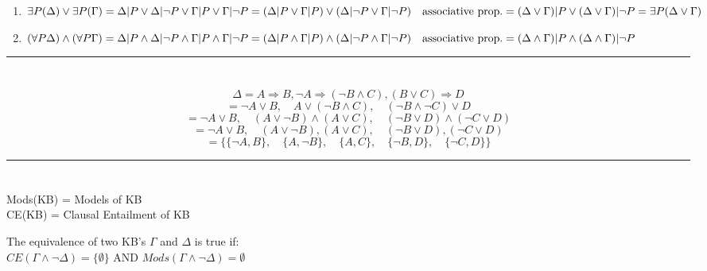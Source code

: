 \documentclass{article}
\begin{document}
\section{}
\renewcommand{\labelenumi}{(\alph{enumi})}
 \begin{enumerate}
   \item $\exists P (\Delta) \lor \exists P (\Gamma) \\
   = \Delta | P \lor \Delta | \lnot P \lor \Gamma | P \lor \Gamma | \lnot P \\
   = (\Delta | P \lor \Gamma | P) \lor (\Delta | \lnot P \lor \Gamma | \lnot P) \quad \textrm{associative prop.}\\
   = (\Delta \lor \Gamma) | P \lor (\Delta \lor \Gamma) | \lnot P \\
   = \exists P (\Delta \lor \Gamma) $
   \item $ (\forall P \Delta) \land (\forall P \Gamma) \\
   = \Delta | P \land \Delta | \lnot P \land \Gamma | P \land \Gamma | \lnot P \\
   = (\Delta | P \land \Gamma | P) \land (\Delta | \lnot P \land \Gamma | \lnot P) \quad \textrm{associative prop.}\\
   = (\Delta \land \Gamma) | P \land (\Delta \land \Gamma) | \lnot P$
 \end{enumerate}

 \noindent\rule{16cm}{0.4pt}
 \section{}
 \[\Delta = A \Rightarrow B, \lnot A \Rightarrow (\lnot B \land C), (B \lor C) \Rightarrow D\]
 \[= \lnot A \lor B, \quad A \lor (\lnot B \land C), \quad (\lnot B \land \lnot C) \lor D\]
 \[= \lnot A \lor B, \quad (A \lor \lnot B) \land (A \lor C), \quad (\lnot B \lor D) \land (\lnot C \lor D)\]
 \[= \lnot A \lor B, \quad (A \lor \lnot B), (A \lor C), \quad (\lnot B \lor D), (\lnot C \lor D)\]
 \[= \{\{\lnot A, B\}, \quad \{A, \lnot B\}, \quad \{A, C\}, \quad \{\lnot B, D\}, \quad \{\lnot C, D\}\}\]
 
 \noindent\rule{16cm}{0.4pt}
 \section{}
 Mods(KB) = Models of KB \\
 CE(KB) = Clausal Entailment of KB\\
 \begin{center}
 The equivalence of two KB's $\Gamma$ and $\Delta$ is true if:\\
 $CE(\Gamma \land \lnot \Delta) = \{\emptyset\}$ AND $Mods(\Gamma \land \lnot \Delta) = \emptyset$
 \end{center}
 
\end{document}
